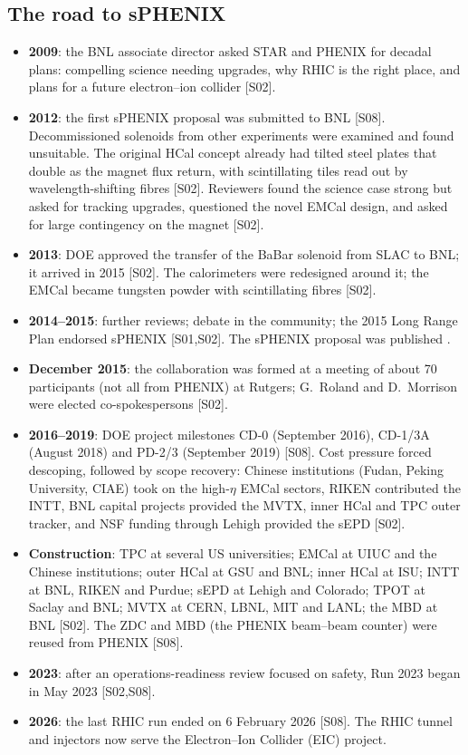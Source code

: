\documentclass[11pt,letterpaper]{article}
\begin{document}
\subsection{The road to sPHENIX}
\begin{itemize}
\item \textbf{2009}: the BNL associate director asked STAR and PHENIX for decadal plans: compelling science needing
upgrades, why RHIC is the right place, and plans for a future electron--ion collider [S02].
\item \textbf{2012}: the first sPHENIX proposal was submitted to BNL [S08]. Decommissioned solenoids from other experiments
were examined and found unsuitable. The original HCal concept already had tilted steel plates that double as the magnet flux
return, with scintillating tiles read out by wavelength-shifting fibres [S02]. Reviewers found the science case strong but
asked for tracking upgrades, questioned the novel EMCal design, and asked for large contingency on the magnet [S02].
\item \textbf{2013}: DOE approved the transfer of the BaBar solenoid from SLAC to BNL; it arrived in 2015 [S02].
The calorimeters were redesigned around it; the EMCal became tungsten powder with scintillating fibres [S02].
\item \textbf{2014--2015}: further reviews; debate in the community; the 2015 Long Range Plan endorsed sPHENIX [S01,S02].
The sPHENIX proposal was published \cite{proposal}.
\item \textbf{December 2015}: the collaboration was formed at a meeting of about 70 participants (not all from PHENIX) at
Rutgers; G.\ Roland and D.\ Morrison were elected co-spokespersons [S02].
\item \textbf{2016--2019}: DOE project milestones CD-0 (September 2016), CD-1/3A (August 2018) and PD-2/3 (September
2019) [S08]. Cost pressure forced descoping, followed by scope recovery: Chinese institutions (Fudan, Peking University,
CIAE) took on the high-$\eta$ EMCal sectors, RIKEN contributed the INTT, BNL capital projects provided the MVTX, inner HCal
and TPC outer tracker, and NSF funding through Lehigh provided the sEPD [S02].
\item \textbf{Construction}: TPC at several US universities; EMCal at UIUC and the Chinese institutions; outer HCal at
GSU and BNL; inner HCal at ISU; INTT at BNL, RIKEN and Purdue; sEPD at Lehigh and Colorado; TPOT at Saclay and BNL; MVTX at
CERN, LBNL, MIT and LANL; the MBD at BNL [S02]. The ZDC and MBD (the PHENIX beam--beam counter) were reused from PHENIX [S08].
\item \textbf{2023}: after an operations-readiness review focused on safety, Run 2023 began in May 2023 [S02,S08].
\item \textbf{2026}: the last RHIC run ended on 6 February 2026 [S08]. The RHIC tunnel and injectors now serve the
Electron--Ion Collider (EIC) project.
\end{itemize}
\end{document}
